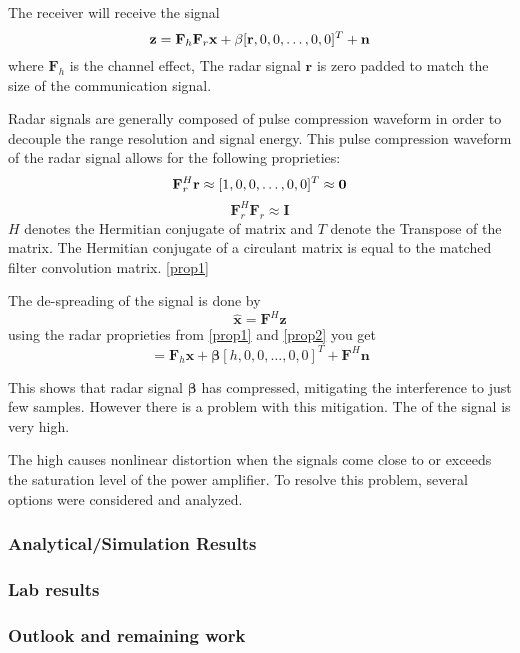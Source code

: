 The receiver will receive the signal
\begin{equation}
\mathbf{z}=\mathbf{F}_h \mathbf{F}_r \mathbf{x} +\beta[\mathbf{r},0,0,\dots,0,0]^T +\mathbf{n}\\
\label{eq2}
\end{equation} 
where $\mathbf{F}_h$ is the channel effect, The radar signal $\mathbf{r}$ is zero padded to match the size of the communication signal.

Radar signals are generally composed of pulse compression waveform in order to decouple the range resolution and signal energy.  This pulse compression waveform of the radar signal allows for the following proprieties:
\begin{equation}
\mathbf{F}_r^H \mathbf{r} \approx [1,0,0,\dots,0,0]^T\approx\mathbf{0} \\
\label{prop1}
\end{equation}
\begin{equation}
\mathbf{F}_r^H \mathbf{F}_r \approx \mathbf{I}
\label{prop2}
\end{equation}
$H$ denotes the Hermitian conjugate of matrix and $T$ denote the Transpose of the matrix.  The Hermitian conjugate of a circulant matrix is equal to the matched filter convolution matrix. \eqref{prop1} 

The de-spreading of the signal is done by
\begin{equation}
\mathbf{\hat{x}}=\mathbf{F}^H\mathbf{z}
\end{equation}
using the radar proprieties from \eqref{prop1} and \eqref{prop2} you get
\begin{equation}
=\mathbf{F}_h\mathbf{x}+\boldsymbol{\beta}[h,0,0,\dots,0,0]^T+\mathbf{F}^H\mathbf{n}
\end{equation} 

This shows that radar signal $\boldsymbol{\beta}$ has compressed, mitigating the interference to just few samples.  However there is a problem with this mitigation.  The \PAR of the signal is very high.  

The high \PAR causes nonlinear distortion when the signals come close to or exceeds the saturation level of the power amplifier.  To resolve this problem, several options were considered and analyzed.

\subsubsection{Analytical/Simulation Results}
\subsubsection{Lab results}
\subsubsection{Outlook and remaining work}
